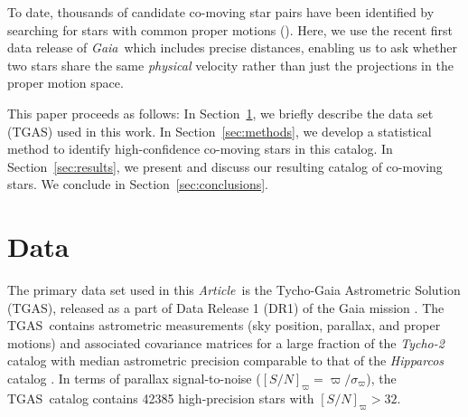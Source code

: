\documentclass[manuscript, letterpaper]{aastex6}
\newcommand{\project}[1]{\textsl{#1}}
\newcommand{\acronym}[1]{{\small{#1}}}
\newcommand{\gaia}{\project{Gaia}}
\newcommand{\documentname}{\textsl{Article}}
\newcommand{\sectionname}{Section}
\newcommand{\dr}{\acronym{DR1}}
\newcommand{\tgas}{\acronym{TGAS}}
\newcommand{\snr}{[S/N]_\varpi}
\begin{document}
To date, thousands of candidate co-moving star pairs have been identified by
searching for stars with common proper motions
(\citealt{Poveda:1994aa,Allen:2000aa,Chaname:2004aa,Lepine:2007aa,Alonso-Floriano:2015aa}).
Here, we use the recent first data release of \gaia\ which includes precise distances,
enabling us to ask whether two stars share the same {\it physical} velocity rather than
just the projections in the proper motion space.

This paper proceeds as follows:
In \sectionname~\ref{sec:data}, we briefly describe the data set (TGAS) used in
this work.
In \sectionname~\ref{sec:methods}, we develop a statistical method to identify
high-confidence co-moving stars in this catalog.
In \sectionname~\ref{sec:results}, we present and discuss our resulting catalog
of co-moving stars.
We conclude in \sectionname~\ref{sec:conclusions}.



\section{Data} \label{sec:data}

The primary data set used in this \documentname\ is the Tycho-Gaia Astrometric
Solution (\tgas), released as a part of Data Release 1 (\dr) of the Gaia mission
\citep{Gaia-Collaboration:2016aa,Lindegren:2016aa}.
The \tgas\ contains astrometric measurements (sky position,
parallax, and proper motions) and associated covariance matrices for a large
fraction of the \project{Tycho-2} catalog \citep{2000A&A...355L..27H} with median
astrometric precision comparable to that of the \project{Hipparcos} catalog
\citep[$\approx 0.3~{\rm mas}$;][]{2007ASSL..350.....V}. In terms of parallax
signal-to-noise ($\snr = \varpi/\sigma_\varpi$), the \tgas\ catalog contains
42385 high-precision stars with $\snr > 32$.
\end{document}
